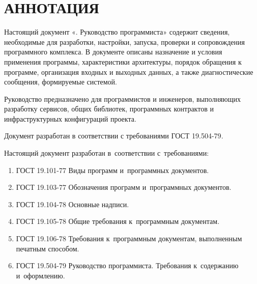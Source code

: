 \documentclass[12pt,a4paper]{extarticle}
\begin{document}
\sloppy




\section*{АННОТАЦИЯ}

Настоящий документ «\hseProjectName. Руководство программиста» содержит сведения, необходимые для разработки, настройки, запуска, проверки и сопровождения программного комплекса. В документе описаны назначение и условия применения программы, характеристики архитектуры, порядок обращения к программе, организация входных и выходных данных, а также диагностические сообщения, формируемые системой.

Руководство предназначено для программистов и инженеров, выполняющих разработку сервисов, общих библиотек, программных контрактов и инфраструктурных конфигураций проекта.

Документ разработан в соответствии с требованиями ГОСТ 19.504-79\cite{gost19504}.

\clearpage

\noindent
Настоящий документ разработан в~соответствии с~требованиями:

\begin{enumerate}[label=\arabic*), leftmargin=1.25cm]
  \item ГОСТ 19.101-77 Виды программ и~программных документов\cite{gost19101}.
  \item ГОСТ 19.103-77 Обозначения программ и~программных документов\cite{gost19103}.
  \item ГОСТ 19.104-78 Основные надписи\cite{gost19104}.
  \item ГОСТ 19.105-78 Общие требования к~программным документам\cite{gost19105}.
  \item ГОСТ 19.106-78 Требования к~программным документам, выполненным
        печатным способом\cite{gost19106}.
  \item ГОСТ 19.504-79 Руководство программиста. Требования
        к~содержанию и~оформлению\cite{gost19504}.
\end{enumerate}
\end{document}
